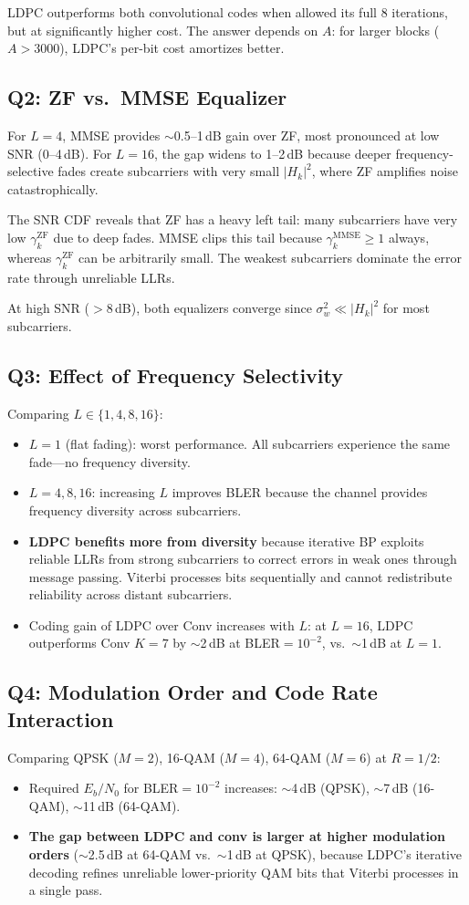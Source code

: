 \documentclass[12pt, a4paper]{article}
\begin{document}
LDPC outperforms both convolutional codes when allowed its full 8 iterations, but at significantly higher cost. The answer depends on $A$: for larger blocks ($A>3000$), LDPC's per-bit cost amortizes better.

\subsection{Q2: ZF vs.\ MMSE Equalizer}
For $L=4$, MMSE provides $\sim$0.5--1\,dB gain over ZF, most pronounced at low SNR (0--4\,dB). For $L=16$, the gap widens to 1--2\,dB because deeper frequency-selective fades create subcarriers with very small $|H_k|^2$, where ZF amplifies noise catastrophically.

The SNR CDF reveals that ZF has a heavy left tail: many subcarriers have very low $\gamma_k^{\text{ZF}}$ due to deep fades. MMSE clips this tail because $\gamma_k^{\text{MMSE}} \geq 1$ always, whereas $\gamma_k^{\text{ZF}}$ can be arbitrarily small. The weakest subcarriers dominate the error rate through unreliable LLRs.

At high SNR ($>8$\,dB), both equalizers converge since $\sigma_w^2 \ll |H_k|^2$ for most subcarriers.

\subsection{Q3: Effect of Frequency Selectivity}
Comparing $L\in\{1,4,8,16\}$:
\begin{itemize}[nosep]
    \item $L=1$ (flat fading): worst performance. All subcarriers experience the same fade---no frequency diversity.
    \item $L=4,8,16$: increasing $L$ improves BLER because the channel provides frequency diversity across subcarriers.
    \item \textbf{LDPC benefits more from diversity} because iterative BP exploits reliable LLRs from strong subcarriers to correct errors in weak ones through message passing. Viterbi processes bits sequentially and cannot redistribute reliability across distant subcarriers.
    \item Coding gain of LDPC over Conv increases with $L$: at $L=16$, LDPC outperforms Conv $K=7$ by $\sim$2\,dB at BLER$=10^{-2}$, vs.\ $\sim$1\,dB at $L=1$.
\end{itemize}

\subsection{Q4: Modulation Order and Code Rate Interaction}
Comparing QPSK ($M=2$), 16-QAM ($M=4$), 64-QAM ($M=6$) at $R=1/2$:
\begin{itemize}[nosep]
    \item Required $E_b/N_0$ for BLER$=10^{-2}$ increases: $\sim$4\,dB (QPSK), $\sim$7\,dB (16-QAM), $\sim$11\,dB (64-QAM).
    \item \textbf{The gap between LDPC and conv is larger at higher modulation orders} ($\sim$2.5\,dB at 64-QAM vs.\ $\sim$1\,dB at QPSK), because LDPC's iterative decoding refines unreliable lower-priority QAM bits that Viterbi processes in a single pass.
\end{itemize}
\end{document}
